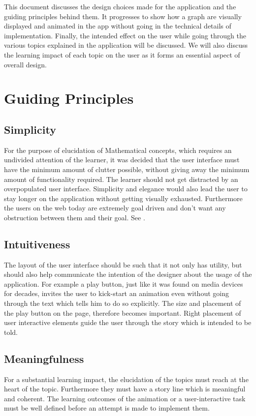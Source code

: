 \graphicspath{ {images/} }

This document discusses the design choices made for the application and the
guiding principles behind them. It progresses to show how a graph are visually
displayed and animated in the app without going in the technical details of
implementation. Finally, the intended effect on the user while going through
the various topics explained in the application will be discussed.  We will
also discuss the learning impact of each topic on the user as it forms an
essential aspect of overall design.

\section{Guiding Principles}

\subsection{Simplicity}
\label{design: simplicity}
For the purpose of elucidation of Mathematical concepts, which requires an
undivided attention of the learner, it was decided that the user interface must
have the minimum amount of clutter possible, without giving away the minimum
amount of functionality required. The learner should not get distracted by an
overpopulated user interface. Simplicity and elegance would also lead the user
to stay longer on the application without getting visually exhausted.
Furthermore the users on the web today are extremely goal driven and don't want any
obstruction between them and their goal. See \cite{Karvonen2000}.

\subsection{Intuitiveness}
The layout of the user interface should be such that it not only has utility,
but should also help communicate the intention of the designer about the usage
of the application. For example a play button, just like it was found on media
devices for decades, invites the user to kick-start an animation even without
going through the text which tells him to do so explicitly. The size and
placement of the play button on the page, therefore becomes important. Right
placement of user interactive elements guide the user through the story which
is intended to be told.

\subsection{Meaningfulness}
For a substantial learning impact, the elucidation of the topics must reach at
the heart of the topic. Furthermore they must have a story line which is
meaningful and coherent. The learning outcomes of the animation or a
user-interactive task must be well defined before an attempt is made to
implement them.

